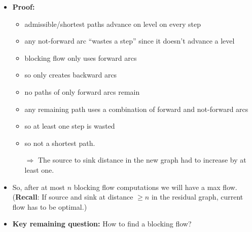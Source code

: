 \documentclass{article}
\begin{document}
\begin{itemize}
\item \textbf{Proof:}
  \begin{itemize}
  \item admissible/shortest paths advance on level on every step
  \item any not-forward arc ``wastes a step'' since it doesn't advance a level
  \item blocking flow only uses forward arcs
  \item so only creates backward arcs
  \item no paths of only forward arcs remain
  \item any remaining path uses a combination of forward and not-forward arcs
  \item so at least one step is wasted
  \item so not a shortest path.

    $\Rightarrow$ The source to sink distance in the new graph had to increase by at least one.
\end{itemize}
\item So, after at most $n$ blocking flow computations we will have a max flow. (\textbf{Recall}: If source and sink at distance $\geq n$ in the residual graph, current flow has to be optimal.)
\item \textbf{Key remaining question:} How to find a blocking flow?
\end{itemize}
\end{document}
